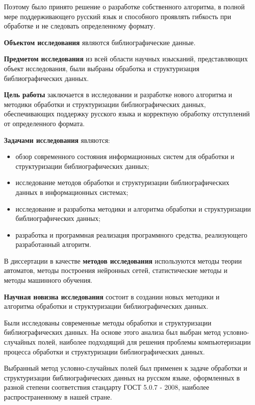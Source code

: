 Поэтому было принято решение о разработке собственного алгоритма, в полной мере поддерживающего русский язык и способного проявлять гибкость при обработке и не следовать определенному формату.

\textbf{Объектом исследования} являются библиографические данные.

\textbf{Предметом исследования} из всей области научных изысканий, представляющих объект исследования, были выбраны обработка и структуризация библиографических данных.

\textbf{Цель работы} заключается в исследовании и разработке нового алгоритма и методики обработки и структуризации библиографических данных, обеспечивающих поддержку русского языка и корректную обработку отступлений от определенного формата.

\textbf{Задачами исследования} являются:
\begin{itemize}
	\item обзор современного состояния информационных систем для обработки и структуризации библиографических данных;
	\item исследование методов обработки и структуризации библиографических данных в информационных системах;
	\item исследование и разработка методики и алгоритма обработки и структуризации библиографических данных;
	\item разработка и программная реализация программного средства, реализующего разработанный алгоритм.
\end{itemize}

В диссертации в качестве \textbf{методов исследования} используются методы теории автоматов, методы построения нейронных сетей, статистические методы и методы машинного обучения.

\textbf{Научная новизна исследования} состоит в создании новых методики и алгоритма обработки и структуризации библиографических данных.

Были исследованы современные методы обработки и структуризации библиографических данных. На основе этого анализа был выбран метод условно-случайных полей, наиболее подходящий для решения проблемы компьютеризации процесса обработки и структуризации библиографических данных.

Выбранный метод условно-случайных полей был применен к задаче обработки и структуризации библиографических данных на русском языке, оформленных в разной степени соответствия стандарту ГОСТ 5.0.7 - 2008, наиболее распространенному в нашей стране.

